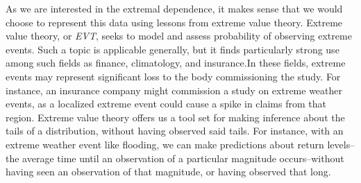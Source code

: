 As we are interested in the extremal dependence, it makes sense that we would choose to represent
  this data using lessons from extreme value theory.  Extreme value theory, or \emph{EVT}, seeks
  to model and assess probability of observing extreme events.  Such a topic is applicable
  generally, but it finds particularly strong use among such fields as finance\cite{allen2013},
  climatology\cite{trepanier2018}, and insurance.\findcite  In these fields, extreme events may
  represent significant loss to the body commissioning the study.  For instance, an insurance
  company might commission a study on extreme weather events, as a localized extreme event could
  cause a spike in claims from that region.  Extreme value theory offers us a tool set for making
  inference about the tails of a distribution, without having observed said tails.  For instance,
  with an extreme weather event like flooding, we can make predictions about return levels--the
  average time until an observation of a particular magnitude occurs--without having seen an
  observation of that magnitude, or having observed that long.


